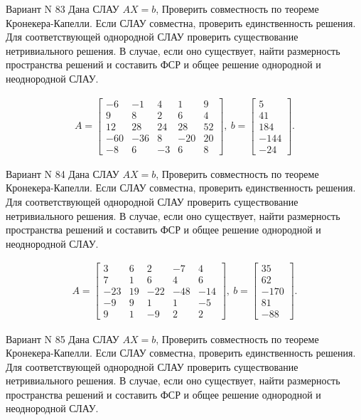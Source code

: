 \documentclass[11pt]{report}
\begin{document}
Вариант N 83
Дана СЛАУ $AX = b$,
Проверить совместность по теореме Кронекера-Капелли. Если СЛАУ совместна, проверить единственность решения.
Для соответствующей однородной СЛАУ проверить существование нетривиального решения. В случае, если оно существует,
найти размерность пространства решений и составить ФСР и общее решение однородной  и неоднородной СЛАУ.


\begin{align*}
 A = \left[\begin{matrix}-6 & -1 & 4 & 1 & 9\\9 & 8 & 2 & 6 & 4\\12 & 28 & 24 & 28 & 52\\-60 & -36 & 8 & -20 & 20\\-8 & 6 & -3 & 6 & 8\end{matrix}\right],
\ b = \left[\begin{matrix}5\\41\\184\\-144\\-24\end{matrix}\right]. 
 \end{align*}

Вариант N 84
Дана СЛАУ $AX = b$,
Проверить совместность по теореме Кронекера-Капелли. Если СЛАУ совместна, проверить единственность решения.
Для соответствующей однородной СЛАУ проверить существование нетривиального решения. В случае, если оно существует,
найти размерность пространства решений и составить ФСР и общее решение однородной  и неоднородной СЛАУ.


\begin{align*}
 A = \left[\begin{matrix}3 & 6 & 2 & -7 & 4\\7 & 1 & 6 & 4 & 6\\-23 & 19 & -22 & -48 & -14\\-9 & 9 & 1 & 1 & -5\\9 & 1 & -9 & 2 & 2\end{matrix}\right],
\ b = \left[\begin{matrix}35\\62\\-170\\81\\-88\end{matrix}\right]. 
 \end{align*}

Вариант N 85
Дана СЛАУ $AX = b$,
Проверить совместность по теореме Кронекера-Капелли. Если СЛАУ совместна, проверить единственность решения.
Для соответствующей однородной СЛАУ проверить существование нетривиального решения. В случае, если оно существует,
найти размерность пространства решений и составить ФСР и общее решение однородной  и неоднородной СЛАУ.
\end{document}
